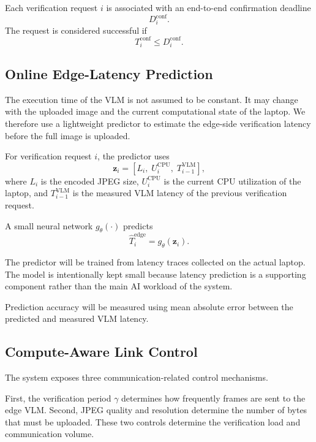 Each verification request $i$ is associated with an end-to-end confirmation
deadline
\[
D_i^{\mathrm{conf}}.
\]
The request is considered successful if
\begin{equation}
T_i^{\mathrm{conf}}
\leq
D_i^{\mathrm{conf}}.
\end{equation}

\subsection{Online Edge-Latency Prediction}

The execution time of the VLM is not assumed to be constant. It may change
with the uploaded image and the current computational state of the laptop.
We therefore use a lightweight predictor to estimate the edge-side
verification latency before the full image is uploaded.

For verification request $i$, the predictor uses
\begin{equation}
\mathbf{z}_i
=
\left[
L_i,\;
U_i^{\mathrm{CPU}},\;
T_{i-1}^{\mathrm{VLM}}
\right],
\end{equation}
where $L_i$ is the encoded JPEG size,
$U_i^{\mathrm{CPU}}$ is the current CPU utilization of the laptop, and
$T_{i-1}^{\mathrm{VLM}}$ is the measured VLM latency of the previous
verification request.

A small neural network $g_\theta(\cdot)$ predicts
\begin{equation}
\hat T_i^{\mathrm{edge}}
=
g_\theta(\mathbf{z}_i).
\end{equation}

The predictor will be trained from latency traces collected on the actual
laptop. The model is intentionally kept small because latency prediction is
a supporting component rather than the main AI workload of the system.

Prediction accuracy will be measured using mean absolute error between the
predicted and measured VLM latency.

\subsection{Compute-Aware Link Control}

The system exposes three communication-related control mechanisms.

First, the verification period $\gamma$ determines how frequently frames are
sent to the edge VLM. Second, JPEG quality and resolution determine the number
of bytes that must be uploaded. These two controls determine the verification
load and communication volume.

